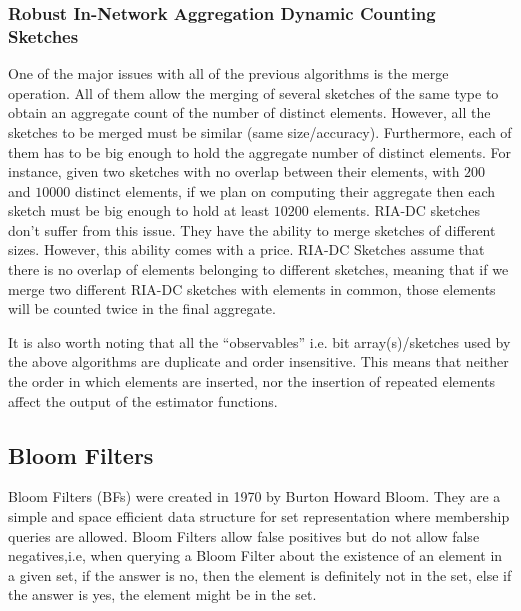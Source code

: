 \subsubsection{Robust In-Network Aggregation Dynamic Counting Sketches}
\label{sec:robust-netw-dynamic}
One of the major issues with all of the previous algorithms is the
merge operation. All of them allow the merging of several sketches of
the same type to obtain an aggregate count of the number of distinct
elements. However, all the sketches to be merged must be similar (same
size/accuracy). Furthermore, each of them has to be big enough to hold
the aggregate number of distinct elements. For instance, given two
sketches with no overlap between their elements, with $200$ and
$10000$ distinct elements, if we plan on computing their aggregate 
then each sketch must be big enough to hold at least $10200$ elements.
RIA-DC sketches don't suffer from this issue. They have the ability to
merge sketches of different sizes. However, this ability comes with a
price. RIA-DC Sketches assume that there is no overlap of elements
belonging to different sketches, meaning that if we merge two
different RIA-DC sketches with elements in common, those elements will
be counted twice in the final aggregate.

It is also worth noting that all the ``observables'' i.e. bit
array(s)/sketches used by the above algorithms are duplicate and order
insensitive. This means that neither the order in which elements
are inserted, nor the insertion of repeated elements affect the
output of the estimator functions.

\subsection{Bloom Filters}
\label{sec:bloom_filters}

Bloom Filters (BFs) were created in 1970 \cite{Bloom1970} by Burton
Howard Bloom. They are a simple and space efficient data structure for
set representation where membership queries are allowed. Bloom Filters
allow false positives but do not allow false negatives,i.e, when
querying a Bloom Filter about the existence of an element in a given
set, if the answer is no, then the element is definitely not in the
set, else if the answer is yes, the element might be in the set.

